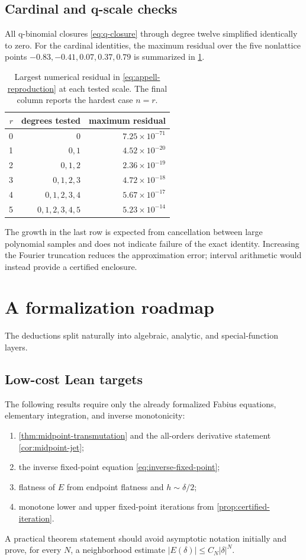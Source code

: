 \documentclass[11pt,oneside]{article}
\theoremstyle{definition}
\theoremstyle{remark}
\begin{document}
\subsection{Cardinal and q-scale checks}
All q-binomial closures \eqref{eq:q-closure} through degree twelve simplified identically to zero.  For the cardinal identities, the maximum residual over the five nonlattice points
$-0.83,-0.41,0.07,0.37,0.79$ is summarized in \cref{tab:reproduction-errors}.

\begin{table}[H]
\centering
\caption{Largest numerical residual in \eqref{eq:appell-reproduction} at each tested scale.  The final column reports the hardest case $n=r$.}
\label{tab:reproduction-errors}
\begin{tabular}{@{}rrr@{}}
\toprule
$r$ & degrees tested & maximum residual\\
\midrule
0 & $0$ & $7.25\times10^{-71}$\\
1 & $0,1$ & $4.52\times10^{-20}$\\
2 & $0,1,2$ & $2.36\times10^{-19}$\\
3 & $0,1,2,3$ & $4.72\times10^{-18}$\\
4 & $0,1,2,3,4$ & $5.67\times10^{-17}$\\
5 & $0,1,2,3,4,5$ & $5.23\times10^{-14}$\\
\bottomrule
\end{tabular}
\end{table}
The growth in the last row is expected from cancellation between large polynomial samples and does not indicate failure of the exact identity.  Increasing the Fourier truncation reduces the approximation error; interval arithmetic would instead provide a certified enclosure.

\section{A formalization roadmap}
\label{sec:formalization}

The deductions split naturally into algebraic, analytic, and special-function layers.

\subsection{Low-cost Lean targets}
The following results require only the already formalized Fabius equations, elementary integration, and inverse monotonicity:
\begin{enumerate}
\item \cref{thm:midpoint-transmutation} and the all-orders derivative statement \cref{cor:midpoint-jet};
\item the inverse fixed-point equation \eqref{eq:inverse-fixed-point};
\item flatness of $E$ from endpoint flatness and $h\sim\delta/2$;
\item monotone lower and upper fixed-point iterations from \cref{prop:certified-iteration}.
\end{enumerate}
A practical theorem statement should avoid asymptotic notation initially and prove, for every $N$, a neighborhood estimate $|E(\delta)|\le C_N|\delta|^N$.
\end{document}
